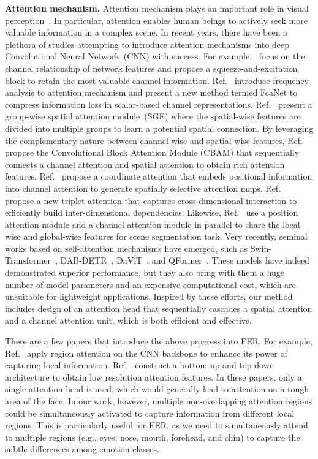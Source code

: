\documentclass{article}
\begin{document}
\noindent\textbf{{Attention mechanism.}}  Attention mechanism plays an important role in visual perception~\cite{rensink2000dynamic,corbetta2002control}. In particular, attention enables human beings to actively seek more valuable information in a complex scene. In recent years, there have been a plethora of studies attempting to introduce attention mechanisms into deep Convolutional Neural Network~(CNN) with success. For example,~\cite{hu2018squeeze} focus on the channel relationship of network features and propose a squeeze-and-excitation block to retain the most valuable channel information. {Ref.}~\cite{qin2021fcanet} {introduce frequency analysis to attention mechanism and present a new method termed FcaNet to compress information loss in scalar-based channel representations.} {Ref.}~\cite{li2019spatial} present a group-wise spatial attention module~(SGE) where the spatial-wise features are divided into multiple groups to learn a potential spatial connection. By leveraging the complementary nature between channel-wise and spatial-wise features, {Ref.}~\cite{woo2018cbam} propose the Convolutional Block Attention Module (CBAM) that sequentially connects a channel attention and spatial attention to obtain rich attention features. {Ref.}~\cite{hou2021coordinate} {propose a coordinate attention that embeds positional information into channel attention to generate spatially selective attention maps.} {Ref.}~\cite{misra2021rotate} {propose a new triplet attention that captures cross-dimensional interaction to efficiently build inter-dimensional dependencies.} Likewise, {Ref.}~\cite{fu2019dual} use a position attention module and a channel attention module in parallel to share the local-wise and global-wise features for scene segmentation task. Very recently, seminal works based on self-attention mechanisms have emerged, such as Swin-Transformer~\cite{liu2021swin}, DAB-DETR~\cite{liu2022dab}, {DaViT}~\cite{ding2022davit}, and {QFormer}~\cite{zhang2023vision}. These models have indeed demonstrated superior performance, but they also bring with them a huge number of model parameters and an expensive computational cost, which are unsuitable for lightweight applications. Inspired by these efforts, our method includes design of an attention head that sequentially cascades a spatial attention and a channel attention unit, which is both efficient and effective.

There are a few papers that introduce the above progress into FER. For example, {Ref.}~\cite{xie2019deep} apply region attention on the CNN backbone to enhance its power of capturing local information. {Ref.}~\cite{zhu2019discriminative} construct a bottom-up and top-down architecture to obtain low resolution attention features. In these papers, only a single attention head is used, which would generally lead to attention on a rough area of the face. In our work, however, multiple non-overlapping attention regions could be simultaneously activated to capture information from different local regions. This is particularly useful for FER, as we need to simultaneously attend to multiple regions (e.g., eyes, nose, mouth, forehead, and chin) to capture the subtle differences among emotion classes.
\end{document}
